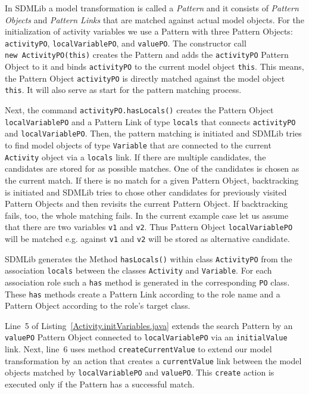 \documentclass[submission,copyright,creativecommons]{eptcs}
\begin{document}
In SDMLib a model transformation is called a \emph{Pattern} and it consists 
of \emph{Pattern Objects} and \emph{Pattern Links} that are matched against 
actual model objects. For the initialization of activity variables we use a 
Pattern with three Pattern Objects: \texttt{activityPO}, \texttt{localVariablePO}, 
and \texttt{valuePO}. The constructor call \texttt{new~ActivityPO(this)} creates 
the Pattern and adds the \texttt{activityPO} Pattern Object to it and binds 
\texttt{activityPO} to the current model object \texttt{this}. This means, 
the Pattern Object \texttt{activityPO} is directly matched against the 
model object \texttt{this}. It will also serve as start for the pattern 
matching process. 

Next, the command \texttt{activityPO.hasLocals()} creates the Pattern Object 
\texttt{localVariablePO} and a Pattern Link of type \texttt{locals} that connects 
\texttt{activityPO} and \texttt{localVariablePO}. Then, the pattern matching is 
initiated and SDMLib tries to find model objects of type \texttt{Variable}
that are connected to the current \texttt{Activity} object via a \texttt{locals} link. 
If there are multiple candidates, the candidates are stored for as possible matches. 
One of the candidates is chosen as the current match. 
If there is no match for a given Pattern Object, backtracking is initiated and SDMLib 
tries to chose other candidates for previously visited Pattern Objects and then revisits
the current Pattern Object. If backtracking fails, too, the whole matching fails. 
In the current example case let us assume that there are two variables \texttt{v1} and \texttt{v2}. Thus Pattern Object \texttt{localVariablePO} will be matched e.g. against \texttt{v1} and \texttt{v2} will be stored as alternative candidate. 

SDMLib generates the Method \texttt{hasLocals()} within class \texttt{ActivityPO} from the association \texttt{locals} 
between the classes \texttt{Activity} and \texttt{Variable}. For each association role such a \texttt{has} method is generated in the corresponding \texttt{PO} class. These \texttt{has} methods create a Pattern Link according to the role name and a Pattern Object according 
to the role's target class. 

Line~5 of Listing~\ref{Activity.initVariables.java} extends the search Pattern by an \texttt{valuePO} Pattern Object connected to \texttt{localVariablePO} via an \texttt{initialValue} link. Next, line~6 uses method \texttt{createCurrentValue} to extend our model transformation by an action that creates a \texttt{currentValue} link between the model objects matched by \texttt{localVariablePO} and \texttt{valuePO}. This \texttt{create} action is executed only if the Pattern has a successful match. 
\end{document}
